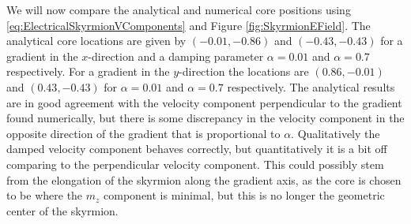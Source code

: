 We will now compare the analytical and numerical core positions using \eqref{eq:ElectricalSkyrmionVComponents} and Figure \ref{fig:SkyrmionEField}. The analytical core locations are given by $\left(-0.01, -0.86\right)$ and $\left(-0.43, -0.43\right)$ for a gradient in the $x$-direction and a damping parameter $\alpha=0.01$ and $\alpha=0.7$ respectively. For a gradient in the $y$-direction the locations are $\left(0.86,-0.01\right)$ and $\left(0.43, -0.43\right)$ for $\alpha=0.01$ and $\alpha=0.7$ respectively. The analytical results are in good agreement with the velocity component perpendicular to the gradient found numerically, but there is some discrepancy in the velocity component in the opposite direction of the gradient that is proportional to $\alpha$. Qualitatively the damped velocity component behaves correctly, but quantitatively it is a bit off comparing to the perpendicular velocity component. This could possibly stem from the elongation of the skyrmion along the gradient axis, as the core is chosen to be where the $m_z$ component is minimal, but this is no longer the geometric center of the skyrmion. 
